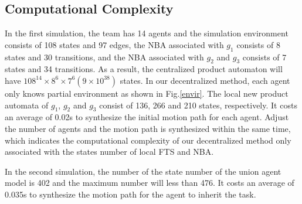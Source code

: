 \documentclass[journal]{IEEEtran}
\begin{document}
\subsection{Computational Complexity}
In the first simulation, the team has 14 agents and the simulation environment consists of 108 states and 97 edges, the NBA associated with $g_1$ consists of 8 states and 30 transitions, and the NBA associated with $g_2$ and $g_3$ consists of 7 states and 34 transitions. As a result, the centralized product automaton will have $108^{14}\times 8^6 \times 7^6(9\times 10^{38})$ states. In our decentralized method, each agent only knows partial environment as shown in Fig.\ref{envir}. The local new product automata of $g_1$, $g_2$ and $g_3$ consist of 136, 266 and 210 states, respectively. It costs an average of 0.02s to synthesize the initial motion path for each agent. Adjust the number of agents and the motion path is synthesized within the same time, which indicates the computational complexity of our decentralized method only associated with the states number of local FTS and NBA.\par
In the second simulation, the number of the state number of the union agent model is 402 and the maximum number will less than 476. It costs an average of 0.035s to synthesize the motion path for the agent to inherit the task.

%
\end{document}
